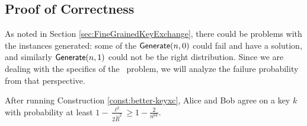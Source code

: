 \subsection{Proof of Correctness}
As noted in Section \ref{sec:FineGrainedKeyExchange}, there could be problems with the instances generated: some of the $\mathsf{Generate}(n,0)$ could fail and have a solution, and similarly $\mathsf{Generate}(n,1)$ could not be the right distribution. Since we are dealing with the specifics of the \zkclique~problem, we will analyze the failure probability from that perspective.

\begin{lemma}\label{lem:n2-keyxc-correct}
	After running Construction \ref{const:better-keyxc}, Alice and Bob agree on a key $k$ with probability at least $1 - \frac{\ell^2}{2\hat R^2} \ge 1 - \frac{2}{n^{6k}}$.
\end{lemma}
